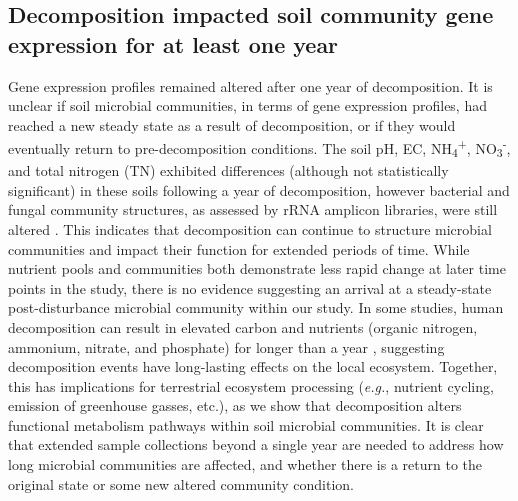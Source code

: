 \documentclass[
  sn-nature,
  lineno, referee]{sn-jnl}
\begin{document}
\subsection{Decomposition impacted soil community gene expression for at
least one
year}\label{decomposition-impacted-soil-community-gene-expression-for-at-least-one-year}

Gene expression profiles remained altered after one year of
decomposition. It is unclear if soil microbial communities, in terms of
gene expression profiles, had reached a new steady state as a result of
decomposition, or if they would eventually return to pre-decomposition
conditions. The soil pH, EC, NH\textsubscript{4}\textsuperscript{+},
NO\textsubscript{3}\textsuperscript{-}, and total nitrogen (TN)
exhibited differences (although not statistically significant) in these
soils following a year of decomposition, however bacterial and fungal
community structures, as assessed by rRNA amplicon libraries, were still
altered \citep{taylor_transient_2024}. This indicates that decomposition
can continue to structure microbial communities and impact their
function for extended periods of time. While nutrient pools and
communities both demonstrate less rapid change at later time points in
the study, there is no evidence suggesting an arrival at a steady-state
post-disturbance microbial community within our study. In some studies,
human decomposition can result in elevated carbon and nutrients (organic
nitrogen, ammonium, nitrate, and phosphate) for longer than a year
\citep{debruyn_carrion_2024}, suggesting decomposition events have
long-lasting effects on the local ecosystem. Together, this has
implications for terrestrial ecosystem processing (\emph{e.g.}, nutrient
cycling, emission of greenhouse gasses, etc.), as we show that
decomposition alters functional metabolism pathways within soil
microbial communities. It is clear that extended sample collections
beyond a single year are needed to address how long microbial
communities are affected, and whether there is a return to the original
state or some new altered community condition.
\end{document}
